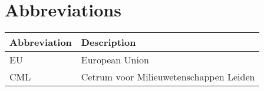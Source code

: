 \newpage
\chapter*{Abbreviations}

\begin{table}[H]\footnotesize
	\centering
	\renewcommand{\arraystretch}{1.5}
	\begin{tabular}{|l|l|}
		\hline
		\textbf{Abbreviation} & \textbf{Description}\\
		\hline
		EU & European Union\\
		\hline
		CML & Cetrum voor Milieuwetenschappen Leiden\\
		\hline		
	\end{tabular}

\end{table}
